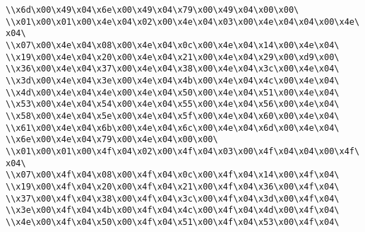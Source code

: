 \verb|\\x6d\x00\x49\x04\x6e\x00\x49\x04\x79\x00\x49\x04\x00\x00\|\newline
\verb|\\x01\x00\x01\x00\x4e\x04\x02\x00\x4e\x04\x03\x00\x4e\x04\x04\x00\x4e\x04\|\newline
\verb|\\x07\x00\x4e\x04\x08\x00\x4e\x04\x0c\x00\x4e\x04\x14\x00\x4e\x04\|\newline
\verb|\\x19\x00\x4e\x04\x20\x00\x4e\x04\x21\x00\x4e\x04\x29\x00\xd9\x00\|\newline
\verb|\\x36\x00\x4e\x04\x37\x00\x4e\x04\x38\x00\x4e\x04\x3c\x00\x4e\x04\|\newline
\verb|\\x3d\x00\x4e\x04\x3e\x00\x4e\x04\x4b\x00\x4e\x04\x4c\x00\x4e\x04\|\newline
\verb|\\x4d\x00\x4e\x04\x4e\x00\x4e\x04\x50\x00\x4e\x04\x51\x00\x4e\x04\|\newline
\verb|\\x53\x00\x4e\x04\x54\x00\x4e\x04\x55\x00\x4e\x04\x56\x00\x4e\x04\|\newline
\verb|\\x58\x00\x4e\x04\x5e\x00\x4e\x04\x5f\x00\x4e\x04\x60\x00\x4e\x04\|\newline
\verb|\\x61\x00\x4e\x04\x6b\x00\x4e\x04\x6c\x00\x4e\x04\x6d\x00\x4e\x04\|\newline
\verb|\\x6e\x00\x4e\x04\x79\x00\x4e\x04\x00\x00\|\newline
\verb|\\x01\x00\x01\x00\x4f\x04\x02\x00\x4f\x04\x03\x00\x4f\x04\x04\x00\x4f\x04\|\newline
\verb|\\x07\x00\x4f\x04\x08\x00\x4f\x04\x0c\x00\x4f\x04\x14\x00\x4f\x04\|\newline
\verb|\\x19\x00\x4f\x04\x20\x00\x4f\x04\x21\x00\x4f\x04\x36\x00\x4f\x04\|\newline
\verb|\\x37\x00\x4f\x04\x38\x00\x4f\x04\x3c\x00\x4f\x04\x3d\x00\x4f\x04\|\newline
\verb|\\x3e\x00\x4f\x04\x4b\x00\x4f\x04\x4c\x00\x4f\x04\x4d\x00\x4f\x04\|\newline
\verb|\\x4e\x00\x4f\x04\x50\x00\x4f\x04\x51\x00\x4f\x04\x53\x00\x4f\x04\|\newline
